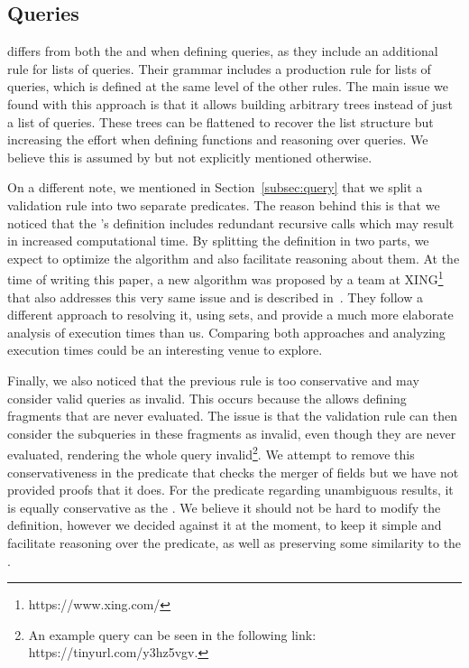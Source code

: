 \subsection{Queries}


\HP differs from both the \spec and \gcoql when defining queries, as they include an additional rule for lists of queries. Their grammar includes a production rule for lists of queries, which is defined at the same level of  the other rules. The main issue we found with this approach is that it allows building arbitrary trees instead of just a list of queries. These trees can be flattened to recover the list structure but increasing the effort when defining functions and reasoning over queries. We believe this is assumed by \HP but not explicitly mentioned otherwise.


On a different note, we mentioned in Section~\ref{subsec:query} that we split a validation rule into two separate predicates. The reason behind this is that we noticed that the \spec's definition includes redundant recursive calls which may result in increased computational time. By splitting the definition in two parts, we expect to optimize the algorithm and also facilitate reasoning about them. At the time of writing this paper, a new algorithm was proposed by a team at XING\footnote{https://www.xing.com/} that also addresses this very same issue and is described in~\cite{xingalg}. They follow a different approach to resolving it, using sets, and provide a much more elaborate analysis of execution times than us. Comparing both approaches and analyzing execution times could be an interesting venue to explore.

Finally, we also noticed that the previous rule is too conservative and may consider valid queries as invalid. This occurs because the \spec allows defining fragments that are never evaluated. The issue is that the validation rule can then consider the subqueries in these fragments as invalid, even though they are never evaluated, rendering the whole query invalid\footnote{An example query can be seen in the following link: https://tinyurl.com/y3hz5vgv.}. We attempt to remove this conservativeness in the predicate that checks the merger of fields but we have not provided proofs that it does. For the predicate regarding unambiguous results, it is equally conservative as the \spec. We believe it should not be hard to modify the definition, however we decided against it at the moment, to keep it simple and facilitate reasoning over the predicate, as well as preserving some similarity to the \spec{}.


